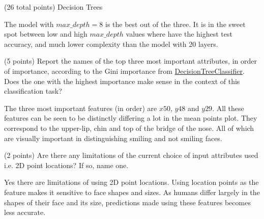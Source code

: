 \documentclass[12pt]{article}
\begin{document}
\begin{question}{(26 total points) Decision Trees}
\begin{subquestion}
\begin{answerbox}{20em}
The model with $max\_depth=8$ is the best out of the three. It is in the sweet spot between low and high $max\_depth$ values where have the highest test accuracy, and much lower complexity than the model with 20 layers.
\end{answerbox}



\end{subquestion}


%
%
\begin{subquestion}{(5 points) 
Report the names of the top three most important attributes, in order of importance, according to the Gini importance from \href{https://scikit-learn.org/0.19/modules/generated/sklearn.tree.DecisionTreeClassifier.html}{DecisionTreeClassifier}. 
Does the one with the highest importance make sense in the context of this classification task? \\
}


\begin{answerbox}{10em}
The three most important features (in order) are $x50$, $y48$ and $y29$. All these features can be seen to be distinctly differing a lot in the mean points plot. They correspond to the upper-lip, chin and top of the bridge of the nose. All of which are visually important in distinguishing smiling and not smiling faces.
\end{answerbox}



\end{subquestion}



%
%
\begin{subquestion}{(2 points) 
Are there any limitations of the current choice of input attributes used i.e. 2D point locations? If so, name one. 
}


\begin{answerbox}{10em}
Yes there are limitations of using 2D point locations. Using location points as the feature makes it sensitive to face shapes and sizes. As humans differ largely in the shapes of their face and its size, predictions made using these features becomes less accurate.
\end{answerbox}



\end{subquestion}


\end{question}
\end{document}
